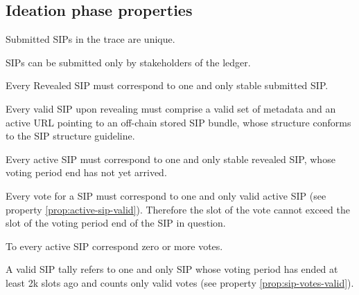 \subsection{Ideation phase properties}

\begin{property}\label{prop:unique-sip}
  Submitted SIPs in the trace are unique.
\end{property}

\begin{property}\label{prop:owner-sip}
  SIPs can be submitted only by stakeholders of the ledger.
\end{property}

\begin{property}\label{prop:reveal-valid}
  Every Revealed SIP must correspond to one and only stable submitted SIP.
\end{property}

\begin{property}\label{prop:sip-valid}
  Every valid SIP upon revealing must comprise a valid set of metadata and an
  active URL pointing to an off-chain stored SIP bundle, whose structure
  conforms to the SIP structure guideline.
\end{property}

\begin{property}\label{prop:active-sip-valid}
  Every active SIP must correspond to one and only stable revealed SIP, whose
  voting period end has not yet arrived.
\end{property}

\begin{property}\label{prop:sip-votes-valid}
  Every vote for a SIP must correspond to one and only valid active SIP (see
  property \ref{prop:active-sip-valid}). Therefore the slot of the vote cannot
  exceed the slot of the voting period end of the SIP in question.
\end{property}

\begin{property}\label{prop:num-votes-sip}
  To every active SIP correspond zero or more votes.
\end{property}

\begin{property}\label{prop:sip-tally-valid}
  A valid SIP tally refers to one and only SIP whose voting period has ended at
  least 2k slots ago and counts only valid votes (see property
  \ref{prop:sip-votes-valid}).
\end{property}

